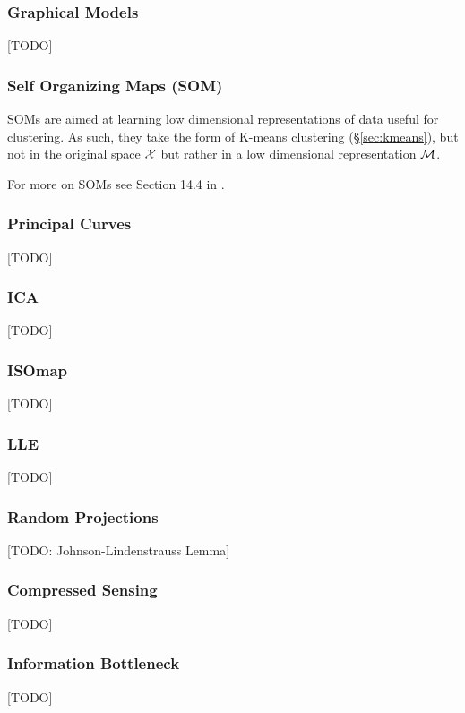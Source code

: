 \subsubsection{Graphical Models}
\label{sec:graphical_model}
[TODO]



\subsubsection{Self Organizing Maps (SOM)}
SOMs are aimed at learning low dimensional representations of data useful for clustering. 
As such, they take the form of K-means clustering (\S\ref{sec:kmeans}), but not in the original space $\mathcal{X}$ but rather in a low dimensional representation $\mathcal{M}$.

For more on SOMs see Section 14.4 in \cite{hastie_elements_2003}. 



\subsubsection{Principal Curves}
[TODO]

\subsubsection{ICA}
[TODO]


\subsubsection{ISOmap}
[TODO]


\subsubsection{LLE}
[TODO]



\subsubsection{Random Projections}
[TODO: Johnson-Lindenstrauss Lemma]



\subsubsection{Compressed Sensing}
\label{sec:compressed_sensing}
[TODO]



\subsubsection{Information Bottleneck}
[TODO]




